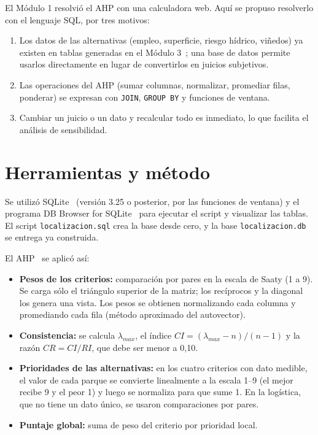 \documentclass[runningheads]{llncs}
\begin{document}
El Módulo 1 resolvió el AHP con una calculadora web. Aquí se propuso resolverlo con el lenguaje SQL, por tres motivos:
\begin{enumerate}
\item Los datos de las alternativas (empleo, superficie, riesgo hídrico, viñedos) ya existen en tablas generadas en el Módulo 3~\cite{modulo3}; una base de datos permite usarlos directamente en lugar de convertirlos en juicios subjetivos.
\item Las operaciones del AHP (sumar columnas, normalizar, promediar filas, ponderar) se expresan con \texttt{JOIN}, \texttt{GROUP BY} y funciones de ventana.
\item Cambiar un juicio o un dato y recalcular todo es inmediato, lo que facilita el análisis de sensibilidad.
\end{enumerate}

\section{Herramientas y método}
Se utilizó SQLite~\cite{sqlite} (versión 3.25 o posterior, por las funciones de ventana) y el programa DB Browser for SQLite~\cite{dbbrowser} para ejecutar el script y visualizar las tablas. El script \texttt{localizacion.sql} crea la base desde cero, y la base \texttt{localizacion.db} se entrega ya construida.

El AHP~\cite{saaty1980} se aplicó así:
\begin{itemize}
\item \textbf{Pesos de los criterios:} comparación por pares en la escala de Saaty (1 a 9). Se carga sólo el triángulo superior de la matriz; los recíprocos y la diagonal los genera una vista. Los pesos se obtienen normalizando cada columna y promediando cada fila (método aproximado del autovector).
\item \textbf{Consistencia:} se calcula $\lambda_{max}$, el índice $CI=(\lambda_{max}-n)/(n-1)$ y la razón $CR=CI/RI$, que debe ser menor a 0,10.
\item \textbf{Prioridades de las alternativas:} en los cuatro criterios con dato medible, el valor de cada parque se convierte linealmente a la escala 1--9 (el mejor recibe 9 y el peor 1) y luego se normaliza para que sume 1. En la logística, que no tiene un dato único, se usaron comparaciones por pares.
\item \textbf{Puntaje global:} suma de peso del criterio por prioridad local.
\end{itemize}
\end{document}
